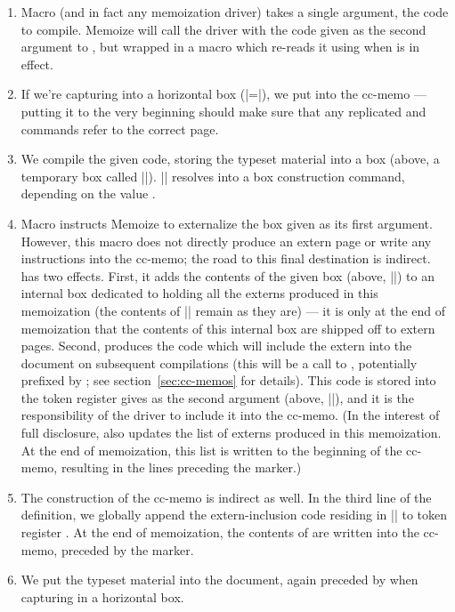 \documentclass[a4paper,11pt]{article}
\begin{document}

\begin{enumerate}
\item Macro  (and in fact any memoization
  driver) takes a single argument, the code to compile.  Memoize will call the
  driver with the code given as the second argument to , but
  wrapped in a macro which re-reads it using  when
   is in effect.
\item If we're capturing into a horizontal box
  (|=|), we put  into
  the cc-memo --- putting it to the very beginning should make sure that any
  replicated  and  commands refer to the correct page.
\item We compile the given code, storing the typeset material into a box
  (above, a temporary box called |\mmz@box|).  |\mmz@capture| resolves into a
  box construction command, depending on the value .
\item Macro  instructs Memoize to externalize the box
  given as its first argument.  However, this macro does not directly produce
  an extern page or write any instructions into the cc-memo; the road to this
  final destination is indirect.   has two effects.
  First, it adds the contents of the given box (above, |\mmz@box|) to an
  internal box dedicated to holding all the externs produced in this
  memoization (the contents of |\mmz@box| remain as they are) --- it is only at
  the end of memoization that the contents of this internal box are shipped off
  to extern pages.  Second,  produces the code which
  will include the extern into the document on subsequent compilations (this
  will be a call to , potentially prefixed by
  ; see section~\ref{sec:cc-memos} for details).  This code
  is stored into the token register gives as the second argument (above,
  |\mmz@temptoks|), and it is the responsibility of the driver to include it
  into the cc-memo.  (In the interest of full disclosure,
   also updates the list of externs produced in this
  memoization.  At the end of memoization, this list is written to the
  beginning of the cc-memo, resulting in the  lines
  preceding the  marker.)
\item The construction of the cc-memo is indirect as well.  In the third line
  of the definition, we globally append the extern-inclusion code residing in
  |\mmz@temptoks| to token register .  At the end of
  memoization, the contents of  are written into the cc-memo,
  preceded by the  marker.
\item We put the typeset material into the document, again preceded by
   when capturing in a horizontal box.
\end{enumerate}
\end{document}
